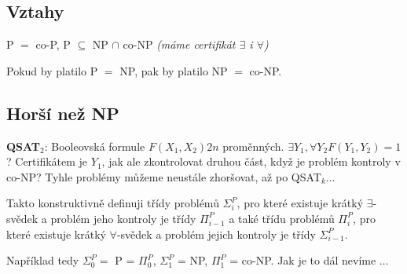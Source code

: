 \subsection{Vztahy}

P $=$ co-P, P $\subseteq$ NP $\cap$ co-NP \textit{(máme certifikát $\exists$ i $\forall$)}

\vspace{4pt}
\noindent Pokud by platilo P $=$ NP, pak by platilo NP $=$ co-NP.

\subsection{Horší než NP}

\textbf{QSAT$_2$}: Booleovská formule $F(X_1, X_2) 2n$ proměnných. $\exists Y_1, \forall Y_2 F(Y_1, Y_2) = 1$? Certifikátem je $Y_1$, jak ale zkontrolovat druhou část, když je problém kontroly v co-NP? Tyhle problémy můžeme neustále zhoršovat, až po QSAT$_k \ldots$

\vspace{4pt}
\noindent Takto konstruktivně definuji třídy problémů $\Sigma_i^P$, pro které existuje krátký $\exists$-svědek a problém jeho kontroly je třídy $\Pi_{i-1}^P$ a také třídu problémů $\Pi_i^P$, pro které existuje krátký $\forall$-svědek a problém jejich kontroly je třídy $\Sigma_{i-1}^P$.

\vspace{4pt}
\noindent Například tedy $\Sigma_0^P = $ P = $\Pi_0^P$, $\Sigma_1^P$ = NP, $\Pi_1^P$ = co-NP. Jak je to dál nevíme $\ldots$
